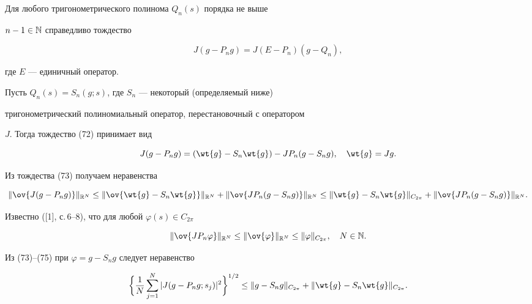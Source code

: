 Для любого тригонометрического полинома $Q_n(s)$ порядка не выше 


$n-1\in \Bbb N$ справедливо тождество


\begin{equation}


J(g-P_ng)=J(E-P_n)(g-Q_n),


\end{equation}


где $E$ --- единичный оператор.





Пусть $Q_n(s)=S_n(g;s)$, где $S_n$ --- некоторый (определяемый ниже)


тригонометрический полиномиальный оператор, перестановочный с оператором


$J$. Тогда тождество (72) принимает вид


\begin{equation}


J(g-P_ng)=(\wt{g}-S_n\wt{g})-JP_n(g-S_ng),\quad \wt{g}=Jg.


\end{equation}


Из тождества (73) получаем неравенства


\begin{equation}


\|\ov{J(g-P_ng)}\|_{\Bbb R^N}\leq \|\ov{\wt{g}-S_n


\wt{g}}\|_{\Bbb R^N}+ \|\ov{JP_n(g-S_ng)}\|_{\Bbb R^N}\leq


\|\wt{g}-S_n\wt{g}\|_{C_{2\pi}}+


\|\ov{JP_n(g-S_ng)}\|_{\Bbb R^N}.


\end{equation}





Известно ([1], с.\,6--8), что для любой $\varphi(s)\in C_{2\pi}$


\begin{equation}


\|\ov{JP_n\varphi}\|_{\Bbb R^N}\leq \|\ov{\varphi}\|_{\Bbb R^N}


\leq \|\varphi\|_{C_{2\pi}},\quad N\in \Bbb N.


\end{equation}


Из (73)--(75) при $\varphi =g-S_ng$ следует неравенство


\begin{equation}


\biggl\{\frac{1}{N}\sum_{j=1}^N| J(g-P_ng;s_j)|^2\biggr\}^{1/2}


\leq \|g-S_ng\|_{C_{2\pi}}+\|\wt{g}-S_n\wt{g}\|_{C_{2\pi}}.


\end{equation}


